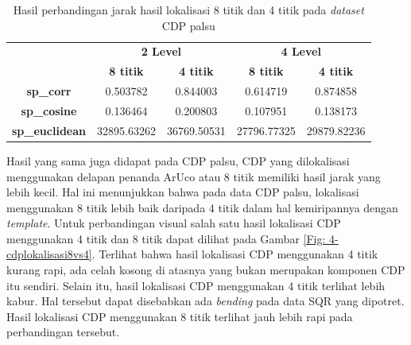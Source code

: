 \begin{table}[!ht]
	\centering
	\caption{Hasil perbandingan jarak hasil lokalisasi 8 titik dan 4 titik pada \emph{dataset} CDP palsu}
	\vspace{0.5em}
	\begin{tabular}{|c|cc|cc|}
		\hline
		\multirow{2}{*}{}      & \multicolumn{2}{c|}{\textbf{2 Level}} & \multicolumn{2}{c|}{\textbf{4 Level}}                                                            \\ \cline{2-5}
		                       & \multicolumn{1}{c|}{\textbf{8 titik}} & \textbf{4 titik}                      & \multicolumn{1}{c|}{\textbf{8 titik}} & \textbf{4 titik} \\ \hline
		\textbf{sp\_corr}      & \multicolumn{1}{c|}{0.503782}         & 0.844003                              & \multicolumn{1}{c|}{0.614719}         & 0.874858         \\ \hline
		\textbf{sp\_cosine}    & \multicolumn{1}{c|}{0.136464}         & 0.200803                              & \multicolumn{1}{c|}{0.107951}         & 0.138173         \\ \hline
		\textbf{sp\_euclidean} & \multicolumn{1}{c|}{32895.63262}      & 36769.50531                           & \multicolumn{1}{c|}{27796.77325}      & 29879.82236      \\ \hline
	\end{tabular}
	\label{Tab: 4-jaraklokalisasiarucovsnonarucopalsu}
\end{table}

Hasil yang sama juga didapat pada CDP palsu, CDP yang dilokalisasi menggunakan delapan penanda ArUco atau 8 titik memiliki hasil jarak yang lebih kecil. Hal
ini menunjukkan bahwa pada data CDP palsu, lokalisasi menggunakan 8 titik lebih baik daripada 4 titik dalam hal kemiripannya dengan \emph{template}. Untuk
perbandingan visual salah satu hasil lokalisasi CDP menggunakan 4 titik dan 8 titik dapat dilihat pada Gambar \ref{Fig: 4-cdplokalisasi8vs4}. Terlihat bahwa
hasil lokalisasi CDP menggunakan 4 titik kurang rapi, ada celah kosong di atasnya yang bukan merupakan komponen CDP itu sendiri. Selain itu, hasil lokalisasi
CDP menggunakan 4 titik terlihat lebih kabur. Hal tersebut dapat disebabkan ada \emph{bending} pada data SQR yang dipotret. Hasil lokalisasi CDP menggunakan 8
titik terlihat jauh lebih rapi pada perbandingan tersebut.

